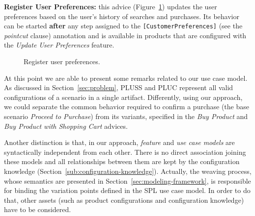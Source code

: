 \documentclass{sig-alt-full}
\begin{document}
{\bf Register User Preferences:} this advice
(Figure~\ref{fig:register-preferences-flow}) updates the user preferences based
on the user's history of searches and purchases. Its behavior can be started {\bf
after} any step assigned to the \texttt{[CustomerPreferences]} (see the
\emph{pointcut} clause) annotation and is available in products that are
configured with the \emph{Update User Preferences} feature.

\begin{figure}[h]
\caption{Register user preferences.}
\label{fig:register-preferences-flow}
\end{figure}

At this point we are able to present some remarks related to our use
case model. As discussed in Section~\ref{sec:problem}, PLUSS and PLUC represent
all valid configurations of a scenario in a single artifact. Differently, using
our approach, we could separate the common behavior required to confirm a
purchase (the base scenario \emph{Proceed to Purchase}) from its variants,
specified in the \emph{Buy Product} and \emph{Buy Product with Shopping Cart}
advices. 

Another distinction is that, in our approach, \emph{feature} and \emph{use case
models} are syntactically independent from each other. There is no direct
association joining these models and all relationships between them are kept by
the configuration knowledge (Section~\ref{sub:configuration-knowledge}).
 Actually, the weaving process, whose semantics are presented in
 Section~\ref{sec:modeling-framework}, is responsible for binding the variation
 points defined in the SPL use case model. In order to do that, other assets
 (such as product configurations and configuration knowledge) have to be
 considered. 
 
\end{document}

